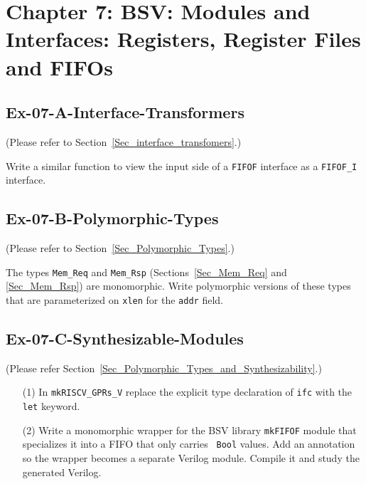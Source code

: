 
\hdivider

\section*{Chapter 7: BSV: Modules and Interfaces:
Registers, Register Files and FIFOs}


\subsection*{Ex-07-A-Interface-Transformers}
\label{Ex-07-A-Interface-Transformers}

(Please refer to Section~\ref{Sec_interface_transfomers}.)

Write a similar function to view the input side of a \verb|FIFOF|
interface as a {\tt FIFOF\_I} interface.


\subsection*{Ex-07-B-Polymorphic-Types}
\label{Ex-07-B-Polymorphic-Types}

(Please refer to Section~\ref{Sec_Polymorphic_Types}.)

The types {\tt Mem\_Req} and {\tt Mem\_Rsp}
(Sections~\ref{Sec_Mem_Req} and \ref{Sec_Mem_Rsp}) are monomorphic.
Write polymorphic versions of these types that are parameterized on
{\tt xlen} for the {\tt addr} field.


\subsection*{Ex-07-C-Synthesizable-Modules}
\label{Ex-07-C-Synthesizable-Modules}

(Please refer Section~\ref{Sec_Polymorphic_Types_and_Synthesizability}.)

\begin{itemize}

\item[(1)] In {\tt mkRISCV\_GPRs\_V} replace the explicit type declaration
      of {\tt ifc} with the {\tt let} keyword.

\item[(2)] Write a monomorphic wrapper for the BSV library {\tt mkFIFOF}
      module that specializes it into a FIFO that only carries {\tt
      Bool} values.  Add an annotation so the wrapper becomes a
      separate Verilog module.  Compile it and study the generated
      Verilog.

\end{itemize}

